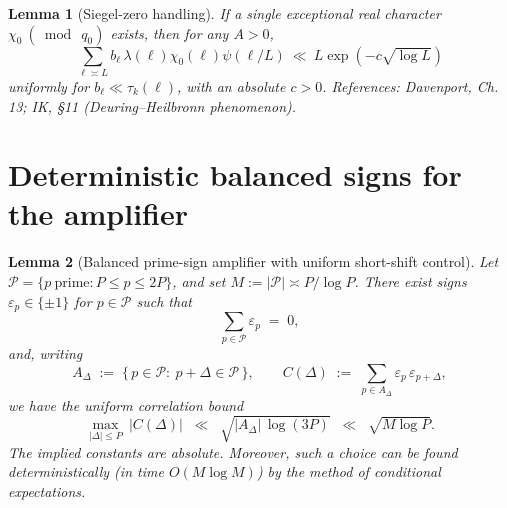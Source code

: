\documentclass[11pt]{article}
\newtheorem{lemma}{Lemma}[part]
\theoremstyle{definition}
\theoremstyle{remark}
\numberwithin{equation}{part}
\begin{document}
\begin{lemma}[Siegel-zero handling]\label{lem:siegel}
	If a single exceptional real character $\chi_0\ (\bmod\ q_0)$ exists, then for any $A>0$,
	\[
		\sum_{\ell\asymp L} b_\ell\,\lambda(\ell)\chi_0(\ell)\psi(\ell/L)\ \ll\ L\exp(-c\sqrt{\log L})
	\]
	uniformly for $b_\ell\ll \tau_k(\ell)$, with an absolute $c>0$. References: Davenport, Ch. 13; IK, \S11 (Deuring--Heilbronn phenomenon).
\end{lemma}

\section{Deterministic balanced signs for the amplifier}


\begin{lemma}[Balanced prime-sign amplifier with uniform short-shift control]\label{lem:balanced-signs}
	Let $\mathcal P=\{p\ \text{prime}: P\le p\le 2P\}$, and set $M:=|\mathcal P|\asymp P/\log P$.
	There exist signs $\varepsilon_p\in\{\pm 1\}$ for $p\in\mathcal P$ such that
	\begin{equation}\label{eq:balanced-sum-zero}
		\sum_{p\in\mathcal P}\varepsilon_p \;=\; 0,
	\end{equation}
	and, writing
	\[
		A_\Delta \;:=\; \{\,p\in\mathcal P:\ p+\Delta\in\mathcal P\,\},
		\qquad
		C(\Delta)\;:=\;\sum_{p\in A_\Delta}\varepsilon_p\,\varepsilon_{p+\Delta},
	\]
	we have the uniform correlation bound
	\begin{equation}\label{eq:balanced-correlation}
		\max_{|\Delta|\le P}\ |C(\Delta)|
		\;\;\ll\;\; \sqrt{|A_\Delta|\,\log(3P)}
		\;\;\ll\;\; \sqrt{M\log P}.
	\end{equation}
	The implied constants are absolute. Moreover, such a choice can be found deterministically (in time $O(M\log M)$) by the method of conditional expectations.
\end{lemma}
\end{document}
